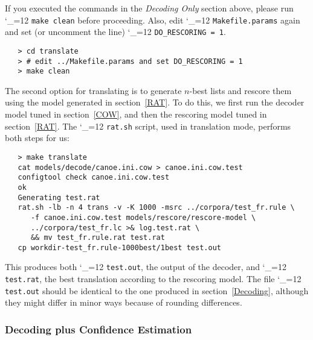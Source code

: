 \documentclass[11pt,letterpaper]{article}
\def\code{\begingroup\catcode`\_=12 \codex}
\newcommand{\codex}[1]{\texttt{#1}\endgroup}
\begin{document}
If you executed the commands in the \emph{Decoding Only} section above, please
run \code{make clean} before proceeding.  Also, edit \code{Makefile.params}
again and set (or uncomment the line) \code{DO_RESCORING = 1}.
\begin{small}
\begin{verbatim}
   > cd translate
   > # edit ../Makefile.params and set DO_RESCORING = 1
   > make clean
\end{verbatim}
\end{small}

The second option for translating is to generate $n$-best lists and rescore
them using the model generated in section~\ref{RAT}. To do this, we first run
the decoder model tuned in section~\ref{COW}, and then the rescoring model
tuned in section~\ref{RAT}.  The \code{rat.sh} script, used in translation
mode, performs both steps for us:
\begin{small}
\begin{verbatim}
   > make translate
   cat models/decode/canoe.ini.cow > canoe.ini.cow.test
   configtool check canoe.ini.cow.test
   ok
   Generating test.rat
   rat.sh -lb -n 4 trans -v -K 1000 -msrc ../corpora/test_fr.rule \
      -f canoe.ini.cow.test models/rescore/rescore-model \
      ../corpora/test_fr.lc >& log.test.rat \
      && mv test_fr.rule.rat test.rat
   cp workdir-test_fr.rule-1000best/1best test.out
\end{verbatim}
\end{small}
This produces both \code{test.out}, the output of the decoder, and
\code{test.rat}, the best translation according to the rescoring model.  The
file \code{test.out} should be identical to the one produced in
section~\ref{Decoding}, although they might differ in minor ways because of
rounding differences.

\subsubsection{Decoding plus Confidence Estimation} \label{CETrans}
\end{document}
